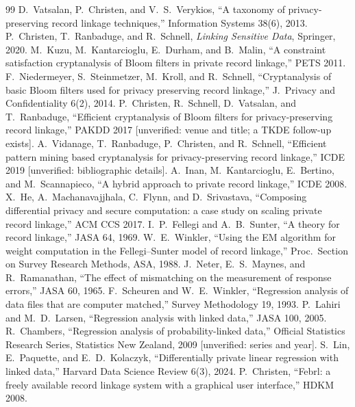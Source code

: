 \documentclass[10pt]{article}
\newcommand{\unverified}[1]{\textcolor{orange!70!black}{[unverified: #1]}}
\begin{document}
\begin{thebibliography}{99}
 D.~Vatsalan, P.~Christen, and V.~S.~Verykios, ``A taxonomy of privacy-preserving record linkage techniques,'' Information Systems 38(6), 2013.
 P.~Christen, T.~Ranbaduge, and R.~Schnell, \emph{Linking Sensitive Data}, Springer, 2020.
 M.~Kuzu, M.~Kantarcioglu, E.~Durham, and B.~Malin, ``A constraint satisfaction cryptanalysis of Bloom filters in private record linkage,'' PETS 2011.
 F.~Niedermeyer, S.~Steinmetzer, M.~Kroll, and R.~Schnell, ``Cryptanalysis of basic Bloom filters used for privacy preserving record linkage,'' J.\ Privacy and Confidentiality 6(2), 2014.
 P.~Christen, R.~Schnell, D.~Vatsalan, and T.~Ranbaduge, ``Efficient cryptanalysis of Bloom filters for privacy-preserving record linkage,'' PAKDD 2017 \unverified{venue and title; a TKDE follow-up exists}.
 A.~Vidanage, T.~Ranbaduge, P.~Christen, and R.~Schnell, ``Efficient pattern mining based cryptanalysis for privacy-preserving record linkage,'' ICDE 2019 \unverified{bibliographic details}.
 A.~Inan, M.~Kantarcioglu, E.~Bertino, and M.~Scannapieco, ``A hybrid approach to private record linkage,'' ICDE 2008.
 X.~He, A.~Machanavajjhala, C.~Flynn, and D.~Srivastava, ``Composing differential privacy and secure computation: a case study on scaling private record linkage,'' ACM CCS 2017.
 I.~P.~Fellegi and A.~B.~Sunter, ``A theory for record linkage,'' JASA 64, 1969.
 W.~E.~Winkler, ``Using the EM algorithm for weight computation in the Fellegi--Sunter model of record linkage,'' Proc.\ Section on Survey Research Methods, ASA, 1988.
 J.~Neter, E.~S.~Maynes, and R.~Ramanathan, ``The effect of mismatching on the measurement of response errors,'' JASA 60, 1965.
 F.~Scheuren and W.~E.~Winkler, ``Regression analysis of data files that are computer matched,'' Survey Methodology 19, 1993.
 P.~Lahiri and M.~D.~Larsen, ``Regression analysis with linked data,'' JASA 100, 2005.
 R.~Chambers, ``Regression analysis of probability-linked data,'' Official Statistics Research Series, Statistics New Zealand, 2009 \unverified{series and year}.
 S.~Lin, E.~Paquette, and E.~D.~Kolaczyk, ``Differentially private linear regression with linked data,'' Harvard Data Science Review 6(3), 2024.
 P.~Christen, ``Febrl: a freely available record linkage system with a graphical user interface,'' HDKM 2008.
\end{thebibliography}
\end{document}
